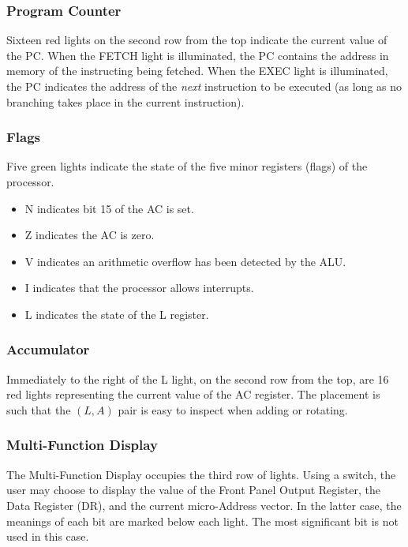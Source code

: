 \documentclass[11pt,a4paper,twocolumns]{article}
\newcommand{\lt}[1]{\textsf{#1}}
\newcommand\unit[1]{{#1}}
\newcommand\ALU{\unit{ALU}}
\newcommand\register[1]{\textsf{#1}}
\newcommand\A{\register{AC}}
\newcommand\Lreg{\register{L}}
\newcommand\DR{\register{DR}}
\newcommand\PC{\register{PC}}
\begin{document}
\subsubsection{Program Counter}

Sixteen red lights on the second row from the top indicate the current value of
the \PC. When the \lt{FETCH} light is illuminated, the \PC{} contains the
address in memory of the instructing being fetched. When the \lt{EXEC} light is
illuminated, the \PC{} indicates the address of the {\em next\/} instruction to
be executed (as long as no branching takes place in the current instruction).

\subsubsection{Flags}

Five green lights indicate the state of the five minor registers (flags) of the
processor.

\begin{itemize}
\item \lt{N} indicates bit 15 of the \A{} is set.
\item \lt{Z} indicates the \A{} is zero.
\item \lt{V} indicates an arithmetic overflow has been detected by the \ALU.
\item \lt{I} indicates that the processor allows interrupts.
\item \lt{L} indicates the state of the \Lreg{} register.
\end{itemize}

\subsubsection{Accumulator}

Immediately to the right of the \lt{L} light, on the second row from the top,
are 16 red lights representing the current value of the \A{} register. The
placement is such that the $(L,A)$ pair is easy to inspect when adding or
rotating.

\subsubsection{Multi-Function Display}

The Multi-Function Display occupies the third row of lights. Using a switch,
the user may choose to display the value of the Front Panel Output Register,
the Data Register (\DR), and the current micro-Address vector. In the latter
case, the meanings of each bit are marked below each light. The most
significant bit is not used in this case.
\end{document}
